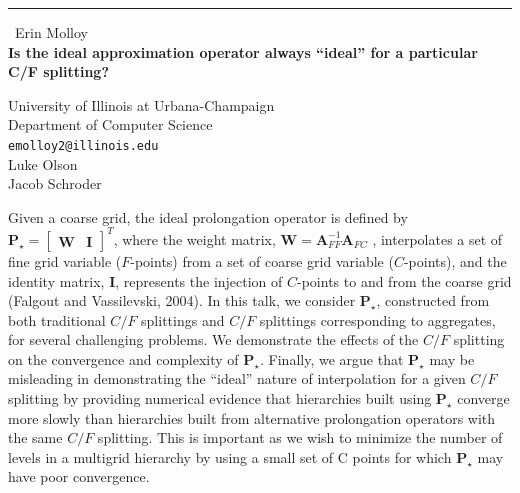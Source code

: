 \documentclass{report}
\begin{document}
\begin{center}
\rule{6in}{1pt} \
{\large Erin Molloy \\
{\bf Is the ideal approximation operator always ``ideal'' for a particular C/F splitting?}}

University of Illinois at Urbana-Champaign \\ Department of Computer Science
\\
{\tt emolloy2@illinois.edu}\\
Luke Olson\\
Jacob Schroder\end{center}

Given a coarse grid, the ideal prolongation operator is defined by
$\mathbf{P}_\star = \begin{bmatrix} \mathbf{W} & \mathbf{I} \end{bmatrix}^T$,
where the weight matrix, $\mathbf{W} = \mathbf{A}_{FF}^{-1} \mathbf{A}_{FC}$ ,
interpolates a set of fine grid variable ($F$-points) from a set of coarse grid variable
($C$-points), and the identity matrix, $\mathbf{I}$, represents the
injection of $C$-points to and from the coarse grid (Falgout and
Vassilevski, 2004).
In this talk, we consider $\mathbf{P}_\star$, constructed from
both traditional $C/F$ splittings and $C/F$ splittings corresponding to
aggregates, for several challenging problems. We demonstrate the effects of the
$C/F$ splitting on the convergence and complexity of $\mathbf{P}_\star$.
Finally, we argue that $\mathbf{P}_\star$ may be misleading in demonstrating the
``ideal'' nature of interpolation for a given $C/F$ splitting by
providing numerical evidence that hierarchies built using
$\mathbf{P}_\star$ converge more slowly
than hierarchies built from alternative prolongation operators with the
same $C/F$ splitting. This is important as we wish to minimize the number
of levels in
a multigrid hierarchy by using a small set of C points for which $\mathbf{P}_\star$
may have poor convergence.
\end{document}
